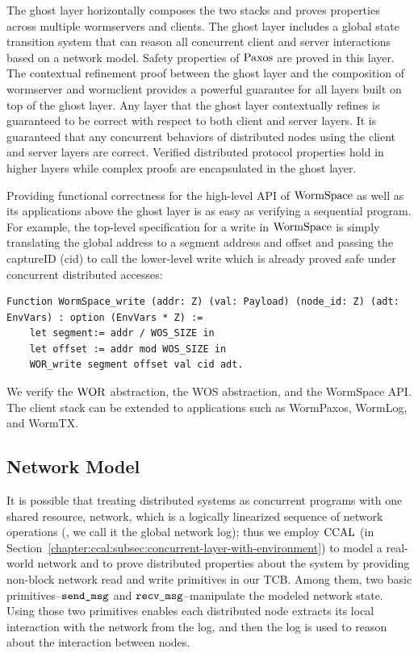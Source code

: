 The ghost layer horizontally composes the two stacks and proves properties across multiple wormservers and clients.
The ghost layer includes a global state transition system that can reason all concurrent client and server interactions based on a network model. 
Safety properties of $\mathrm{Paxos}$ are proved in this layer.
The contextual refinement proof between the ghost layer and the composition of wormserver and wormclient provides a powerful guarantee for all layers built on top of the ghost layer. 
Any layer that the ghost layer contextually refines is guaranteed to be correct with respect to both client and server layers. 
It is guaranteed that any concurrent behaviors of distributed nodes using the client and server layers are correct. 
Verified distributed protocol properties hold in higher layers while complex proofs are encapsulated in the ghost layer.

Providing functional correctness for the high-level API of $\mathrm{WormSpace}$ as well as its applications
above the ghost layer is as easy as verifying a sequential program.
For example, the top-level specification for a write in $\mathrm{WormSpace}$ is simply translating the global address to a segment address and offset and 
passing the captureID (cid) to call the lower-level write which is already proved safe under concurrent distributed accesses:
\begin{lstlisting}
Function WormSpace_write (addr: Z) (val: Payload) (node_id: Z) (adt: EnvVars) : option (EnvVars * Z) :=
    let segment:= addr / WOS_SIZE in 
    let offset := addr mod WOS_SIZE in
    WOR_write segment offset val cid adt.
\end{lstlisting}
We verify the $\mathrm{WOR}$ abstraction, the WOS abstraction, and the WormSpace API.
The client stack can be extended to applications such as WormPaxos, WormLog, and WormTX. 

\subsection{Network Model}
\label{subsec:network_modeling}

It is possible that treating distributed systems as concurrent programs with one shared resource, network, which is
a logically linearized sequence of network operations (\ie, we call it the global network log);
thus we employ $\mathrm{CCAL}$ (in Section~\ref{chapter:ccal:subsec:concurrent-layer-with-environment})
to model a real-world network and to prove distributed properties about the system
by providing non-block network read and write primitives in our TCB. 
Among them, two basic primitives--${\mathrm{\texttt{send\_msg}}}$ and ${\mathrm{\texttt{recv\_msg}}}$--manipulate the modeled network state. 
Using those two primitives enables each distributed node  extracts its local interaction with the network from the log, 
and then the log is used to reason about the interaction between nodes.


